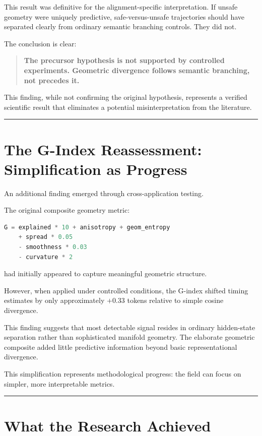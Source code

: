 \documentclass[12pt,a4paper]{article}
\begin{document}
This result was definitive for the alignment-specific interpretation. If unsafe geometry were uniquely predictive, safe-versus-unsafe trajectories should have separated clearly from ordinary semantic branching controls. They did not.

The conclusion is clear:

\begin{quote}
\textbf{The precursor hypothesis is not supported by controlled experiments. Geometric divergence follows semantic branching, not precedes it.}
\end{quote}

This finding, while not confirming the original hypothesis, represents a verified scientific result that eliminates a potential misinterpretation from the literature.

\medskip
\hrule
\medskip

\section{The G-Index Reassessment: Simplification as Progress}

An additional finding emerged through cross-application testing.

The original composite geometry metric:

\begin{lstlisting}[language=Python, style=pythonstyle, caption={Original G-Index Formula}, label=lst:gindex]
G = explained * 10 + anisotropy + geom_entropy
    + spread * 0.05
    - smoothness * 0.03
    - curvature * 2
\end{lstlisting}

had initially appeared to capture meaningful geometric structure.

However, when applied under controlled conditions, the G-index shifted timing estimates by only approximately $+0.33$ tokens relative to simple cosine divergence.

This finding suggests that most detectable signal resides in ordinary hidden-state separation rather than sophisticated manifold geometry. The elaborate geometric composite added little predictive information beyond basic representational divergence.

This simplification represents methodological progress: the field can focus on simpler, more interpretable metrics.

\medskip
\hrule
\medskip

\section{What the Research Achieved}
\end{document}
